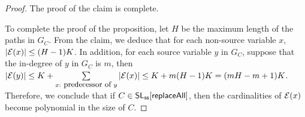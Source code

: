 {\begin{proof}
The proof of the claim is complete.

To complete the proof of the proposition, let $H$ be the maximum length of the paths in $G_C$. From the claim, we deduce that for each non-source variable $x$, $|\mathcal{E}(x)| \le (H-1)K$. In addition, for each source variable $y$ in $G_C$, suppose that the in-degree of $y$ in $G_C$ is $m$, then $|\mathcal{E}(y)| \le K + \sum \limits_{x: \mbox{ \small predecessor of } y} |\mathcal{E}(x)| \le  K+m(H-1)K=(mH-m+1) K$.
%
Therefore, we conclude that if $C \in \mathsf{SL}_{\sf ss}[\mathsf{replaceAll}]$, then the cardinalities of $\mathcal{E}(x)$ become polynomial in the size of $C$.
\end{proof}
}






